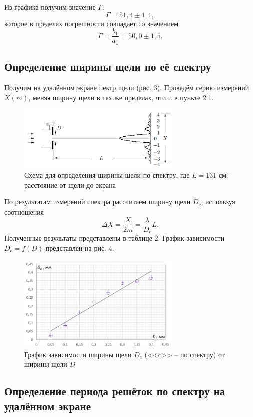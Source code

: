 \documentclass[a4paper]{article}
\begin{document}
\noindent Из графика получим значение $\Gamma$:
$$\Gamma = 51,4 \pm 1,1,$$ которое в пределах погрешности совпадает со значением 
$$\Gamma = \frac{b_1}{a_1} = 50,0 \pm 1,5.$$

\subsection{Определение ширины щели по её спектру}

Получим на удалённом экране пектр щели (рис. 3). Проведём серию измерений $X(m)$, меняя ширину щели в тех же пределах, что и в пункте 2.1.
\begin{figure}[h!]
    \centering
    \includegraphics[width = 0.7\textwidth]{image/scheme2.png}
    \caption{Схема для определения ширины щели по спектру, где $L = 131$ см -- расстояние от щели до экрана}
\end{figure}

\noindent По результатам измерений спектра рассчитаем ширину щели $D_c$, используя соотношения
$$\Delta X = \frac{X}{2m} = \frac{\lambda}{D_c}L.$$ Полученные результаты представлены в таблице 2. График зависимости $D_c = f(D)$ представлен на рис. 4.

\begin{figure}[h!]
    \centering
    \includegraphics[width = 0.7\textwidth]{image/graph2.png}
    \caption{График зависимости ширины щели $D_c$ (<<c>> -- по спектру) от ширины щели $D$}
\end{figure}

\subsection{Определение периода решёток по спектру на удалённом экране}
\end{document}
